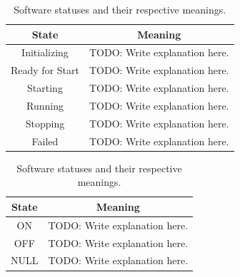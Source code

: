 \documentclass{report}
\begin{document}
\begin{table}[htb]
			\caption{System statuses and their respective meanings.}
			\begin{tabular}{||c c||}
			\hline
			State & Meaning\\ [0.5ex]
			\hline\hline
			Initializing & TODO: Write explanation here. \\
			\hline
			Ready for Start & TODO: Write explanation here.\\
			\hline
			Starting & TODO: Write explanation here. \\
			\hline
			Running & TODO: Write explanation here.\\
			\hline
			Stopping & TODO: Write explanation here.\\
			\hline
			Failed & TODO: Write explanation here.\\ [1ex]
			\hline
			\end{tabular}
			
			\caption{Software statuses and their respective meanings.}
			\begin{tabular}{||c c||}
			\hline
			State & Meaning\\ [0.5ex]
			\hline\hline
			ON & TODO: Write explanation here. \\
			\hline
			OFF & TODO: Write explanation here.\\
			\hline
			NULL & TODO: Write explanation here.\\ [1ex]
			\hline
			\end{tabular}
			
			\end{table}
\appendix		
\end{document}
